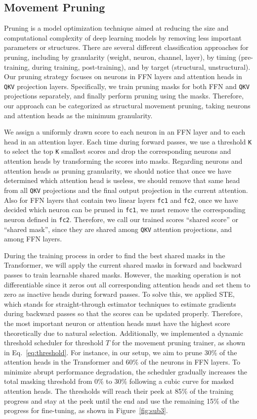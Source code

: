 \subsection{Movement Pruning}
Pruning is a model optimization technique aimed at reducing the size and computational complexity of deep learning models by removing less important parameters or structures. There are several different classification approaches for pruning, including by granularity (weight, neuron, channel, layer), by timing (pre-training, during training, post-training), and by target (structural, unstructural). Our pruning strategy focuses on neurons in FFN layers and attention heads in \texttt{QKV} projection layers. Specifically, we train pruning masks for both FFN and \texttt{QKV} projections separately, and finally perform pruning using the masks. Therefore, our approach can be categorized as structural movement pruning, taking neurons and attention heads as the minimum granularity.

We assign a uniformly drawn score to each neuron in an FFN layer and to each head in an attention layer. Each time during forward passes, we use a threshold \texttt{K} to select the top \texttt{K} smallest scores and drop the corresponding neurons and attention heads by transforming the scores into masks. Regarding neurons and attention heads as pruning granularity, we should notice that once we have determined which attention head is useless, we should remove that same head from all \texttt{QKV} projections and the final output projection in the current attention. Also for FFN layers that contain two linear layers \texttt{fc1} and \texttt{fc2}, once we have decided which neuron can be pruned in \texttt{fc1}, we must remove the corresponding neuron defined in \texttt{fc2}.  Therefore, we call our trained scores ``shared score'' or ``shared mask'', since they are shared among \texttt{QKV} attention projections, and among FFN layers.

During the training process in order to find the best shared masks in the Transformer,
we will apply the current shared masks in forward and backward passes to train learnable shared masks.
However, the masking operation is not differentiable since it zeros out all corresponding attention heads
and set them to zero as inactive heads during forward passes.
To solve this, we applied STE, which stands for straight-through estimator techniques to estimate gradients
during backward passes so that the scores can be updated properly.
Therefore, the most important neuron or attention heads must have the highest score theoretically due to natural selection.
Additionally, we implemented a dynamic threshold scheduler for threshold $T$ for the movement pruning trainer, as shown in Eq.~\ref{eq:threshold}.
For instance, in our setup, we aim to prune 30\% of the attention heads in the Transformer and 60\% of the neurons in FFN layers.
To minimize abrupt performance degradation, the scheduler gradually increases the total masking threshold from 0\% to 30\%
following a cubic curve for masked attention heads.
The thresholds will reach their peek at 85\% of the training progress and stay at the peek
until the end and use the remaining 15\% of the progress for fine-tuning, as shown in Figure~\ref{fig:sub3}.

